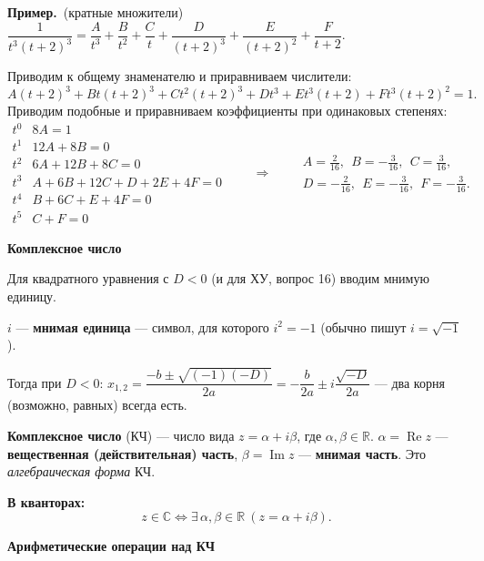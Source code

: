 \documentclass[a4paper,11pt]{article}
\newcommand{\R}{\mathbb{R}}
\newcommand{\C}{\mathbb{C}}
\DeclareMathOperator{\Rez}{Re}
\DeclareMathOperator{\Imz}{Im}
\newcommand{\kv}{\par\noindent\textbf{\textcolor{oprc!85!black}{В кванторах:}}}
\newcommand{\prim}{\par\smallskip\noindent\textbf{\textcolor{teoc!80!black}{Пример.}}\ }
\newcommand{\podr}[1]{\par\needspace{8\baselineskip}\medskip
  {\large\bfseries\textcolor{oprc!80!black}{#1}}\par\nopagebreak\smallskip}
\begin{document}
\prim (кратные множители) \ $\dfrac{1}{t^3 (t + 2)^3} = \dfrac{A}{t^3} + \dfrac{B}{t^2} + \dfrac{C}{t} + \dfrac{D}{(t + 2)^3} + \dfrac{E}{(t + 2)^2} + \dfrac{F}{t + 2}$.

Приводим к общему знаменателю и приравниваем числители:
\[
  A(t + 2)^3 + Bt(t + 2)^3 + Ct^2(t + 2)^3 + Dt^3 + Et^3(t + 2) + Ft^3(t + 2)^2 = 1.
\]
Приводим подобные и приравниваем коэффициенты при одинаковых степенях:
\[
  \begin{array}{c|l}
    t^0 & 8A = 1 \\
    t^1 & 12A + 8B = 0 \\
    t^2 & 6A + 12B + 8C = 0 \\
    t^3 & A + 6B + 12C + D + 2E + 4F = 0 \\
    t^4 & B + 6C + E + 4F = 0 \\
    t^5 & C + F = 0
  \end{array}
  \qquad \Rightarrow \qquad
  \begin{array}{l}
    A = \tfrac{2}{16},\ \ B = -\tfrac{3}{16},\ \ C = \tfrac{3}{16}, \\[4pt]
    D = -\tfrac{2}{16},\ \ E = -\tfrac{3}{16},\ \ F = -\tfrac{3}{16}.
  \end{array}
\]

\podr{Комплексное число}

Для квадратного уравнения с $D < 0$ (и для ХУ, вопрос 16) вводим мнимую единицу.

\begin{opr}
$i$ --- \textbf{мнимая единица} --- символ, для которого $i^2 = -1$ (обычно пишут $i = \sqrt{-1}$).
\end{opr}

Тогда при $D < 0$:
$x_{1,2} = \dfrac{-b \pm \sqrt{(-1)(-D)}}{2a} = -\dfrac{b}{2a} \pm i \dfrac{\sqrt{-D}}{2a}$ --- два корня (возможно, равных) всегда есть.

\begin{opr}
\textbf{Комплексное число} (КЧ) --- число вида $z = \alpha + i\beta$, где $\alpha, \beta \in \R$.
$\alpha = \Rez z$ --- \textbf{вещественная (действительная) часть}, $\beta = \Imz z$ --- \textbf{мнимая часть}.
Это \emph{алгебраическая форма} КЧ.
\kv
\[
  z \in \C \Leftrightarrow \exists\, \alpha, \beta \in \R\ (z = \alpha + i\beta).
\]
\end{opr}

\podr{Арифметические операции над КЧ}
\end{document}
